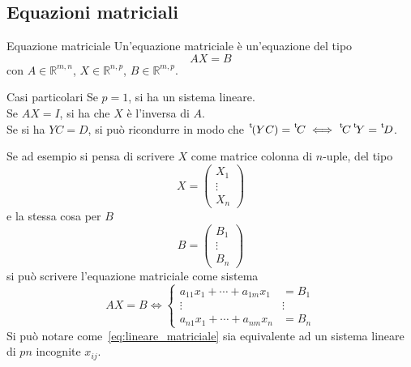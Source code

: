 \subsection{Equazioni matriciali}%
\label{sub:equazioni_matriciali}

\begin{Def}{Equazione matriciale}
  Un'equazione matriciale è un'equazione del tipo
  \begin{equation*}
    AX = B
  \end{equation*}
  con $A\in\mathbb{R}^{m,n}$, $X\in\mathbb{R}^{n,p}$, $B\in\mathbb{R}^{m,p}$.
\end{Def}

\begin{SubDef}{Casi particolari}
  Se $p=1$, si ha un sistema lineare.\\
  Se $AX=I$, si ha che $X$ è l'inversa di $A$.\\
  Se si ha $YC=D$, si può ricondurre in modo che $\mskip1mu\prescript{\smash{\mathrm t\mkern-3mu} }{}{\mathstrut(}YC)=\mskip1mu\prescript{\smash{\mathrm t\mkern-3mu} }{}{\mathstrut C}\iff\mskip1mu\prescript{\smash{\mathrm t\mkern-3mu} }{}{\mathstrut C}\mskip1mu\prescript{\smash{\mathrm t\mkern-3mu} }{}{\mathstrut Y} = \mskip1mu\prescript{\smash{\mathrm t\mkern-3mu} }{}{\mathstrut D}$.
\end{SubDef}

Se ad esempio si pensa di scrivere $X$ come matrice colonna di $n$-uple, del tipo
\begin{equation*}
  X =
  \begin{pmatrix}
    X_1\\
    \vdots\\
    X_n
  \end{pmatrix}
\end{equation*}
e la stessa cosa per $B$
\begin{equation*}
  B =
  \begin{pmatrix}
    B_1\\
    \vdots\\
    B_n
  \end{pmatrix}
\end{equation*}
si può scrivere l'equazione matriciale come sistema
\begin{equation}\label{eq:lineare_matriciale}
  AX = B \iff
    \begin{cases}
      a_{11}x_1 + \cdots + a_{1m}x_1 &= B_1\\
      \vdots & \vdots\\
      a_{n1}x_1 + \cdots + a_{nm}x_n &= B_n
    \end{cases}
\end{equation}
Si può notare come~\eqref{eq:lineare_matriciale} sia equivalente ad un sistema lineare
di $pn$  incognite $x_{ij}$.
